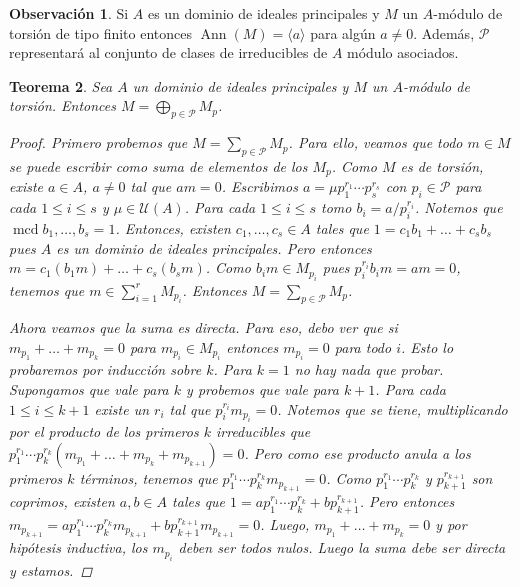 \documentclass[12pt]{book}
\newtheorem{teo}{Teorema}[section]
\theoremstyle{definition}
\newtheorem{obs}[teo]{Observación}
\DeclareMathOperator{\mcd}{mcd}
\DeclareMathOperator{\ann}{Ann}
\begin{document}
\begin{obs}
Si $A$ es un dominio de ideales principales y $M$ un $A$-módulo de torsión de tipo finito entonces $\ann(M)=\langle a\rangle$ para algún $a\neq 0$. Además, $\mathcal{P}$ representará al conjunto de clases de irreducibles de $A$ módulo asociados.
\end{obs}

\begin{teo}
Sea $A$ un dominio de ideales principales y $M$ un $A$-módulo de torsión. Entonces $M = \displaystyle\bigoplus_{p\in\mathcal{P}}M_p$.
\begin{proof}

Primero probemos que $M=\displaystyle\sum_{p\in\mathcal{P}}M_p$. Para ello, veamos que todo $m\in M$ se puede escribir como suma de elementos de los $M_p$. Como $M$ es de torsión, existe $a\in A$, $a\neq 0$ tal que $am=0$. Escribimos $a=\mu p_1^{r_1}\cdots p_s^{r_s}$ con $p_i\in \mathcal{P}$ para cada $1\leq i\leq s$ y $\mu\in\mathcal{U}(A)$. Para cada $1\leq i\leq s$ tomo $b_i = a/p_i^{r_i}$. Notemos que $\mcd{b_1,\ldots , b_s}=1$. Entonces, existen $c_1,\ldots , c_s\in A$ tales que $1 = c_1b_1 + \ldots + c_sb_s$ pues $A$ es un dominio de ideales principales. Pero entonces $m = c_1(b_1m) + \ldots + c_s(b_sm)$. Como $b_im\in M_{p_i}$ pues $p_i^{r_i}b_im = am=0$, tenemos que $m\in\displaystyle\sum_{i=1}^r M_{p_i}$. Entonces $M=\displaystyle\sum_{p\in\mathcal{P}}M_p$.

Ahora veamos que la suma es directa. Para eso, debo ver que si $m_{p_1}+\ldots + m_{p_k}=0$ para $m_{p_i}\in M_{p_i}$ entonces $m_{p_i}=0$ para todo $i$. Esto lo probaremos por inducción sobre $k$. Para $k=1$ no hay nada que probar. Supongamos que vale para $k$ y probemos que vale para $k+1$. Para cada $1\leq i\leq k+1$ existe un $r_i$ tal que $p_i^{r_i}m_{p_i}=0$. Notemos que se tiene, multiplicando por el producto de los primeros $k$ irreducibles que $p_1^{r_1}\cdots p_k^{r_k}(m_{p_1}+\ldots + m_{p_k}+m_{p_{k+1}})=0$. Pero como ese producto anula a los primeros $k$ términos, tenemos que $p_1^{r_1}\cdots p_k^{r_k}m_{p_{k+1}}=0$. Como $p_1^{r_1}\cdots p_k^{r_k}$ y $p_{k+1}^{r_{k+1}}$ son coprimos, existen $a,b\in A$ tales que $1=ap_1^{r_1}\cdots p_k^{r_k} + b p_{k+1}^{r_{k+1}}$. Pero entonces $m_{p_{k+1}} = ap_1^{r_1}\cdots p_k^{r_k}m_{p_{k+1}} + bp_{k+1}^{r_{k+1}}m_{p_{k+1}} = 0$. Luego, $m_{p_1}+\ldots + m_{p_k}=0$ y por hipótesis inductiva, los $m_{p_i}$ deben ser todos nulos. Luego la suma debe ser directa y estamos.

\end{proof}
\end{teo}
\end{document}
